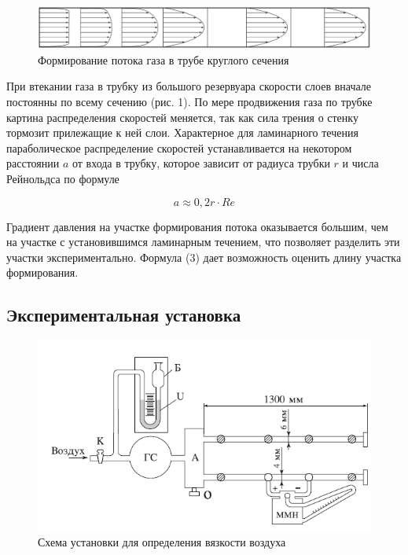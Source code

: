 \documentclass[12pt,a4paper]{article}
\begin{document}
	\begin{figure}[H]
		\begin{center}
			\includegraphics[width=12cm]{res/potok.png}
		\end{center}
		\caption{Формирование потока газа в трубе круглого сечения}
		\label{img1}
	\end{figure}	
	
	
	При втекании газа в трубку из большого резервуара скорости слоев вначале постоянны по всему сечению (рис. 1). По мере продвижения газа по трубке картина распределения скоростей меняется, так как сила трения о стенку тормозит прилежащие к ней слои. Характерное для ламинарного течения параболическое распределение скоростей устанавливается на некотором расстоянии $a$ от входа в трубку, которое зависит от радиуса трубки $r$ и числа Рейнольдса по формуле
	
	\begin{equation}
		a \approx  0,2 r \cdot Re
	\end{equation}

	Градиент давления на участке формирования потока оказывается большим, чем на участке с установившимся ламинарным течением, что позволяет разделить эти участки экспериментально. Формула (3) дает возможность оценить длину участка формирования.
	\subsection*{Экспериментальная установка}
	
	\begin{figure}[H]
		\begin{center}
			\includegraphics[width=12cm]{res/scheme.png}
		\end{center}
		\caption{Схема установки для определения вязкости воздуха}
		\label{img2}
	\end{figure}	
	
\end{document}
